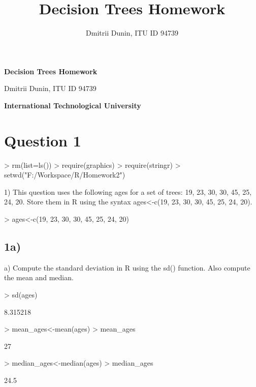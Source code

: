 \documentclass{article}
\title{Decision Trees Homework}
\author{Dmitrii Dunin, ITU ID 94739}
\begin{document}

\begin{center}
{\bf\Large Decision Trees Homework}
\end{center}
\begin{center}
{\Large Dmitrii Dunin, ITU ID 94739}
\end{center}
\begin{center}
{\bf\Large International Technological University}
\end{center}

\section*{Question 1}

\begin{Schunk}
\begin{Sinput}
> rm(list=ls())
> require(graphics)
> require(stringr)
> setwd("F:/Workspace/R/Homework2")
\end{Sinput}
\end{Schunk}

1) This question uses the following ages for a set of trees: 19, 23, 30, 30, 45,
25, 24, 20. Store them in R using the syntax ages<-c(19, 23, 30, 30, 45, 25, 24, 20).
\begin{Schunk}
\begin{Sinput}
> ages<-c(19, 23, 30, 30, 45, 25, 24, 20)
\end{Sinput}
\end{Schunk}
\subsection*{1a)}
a) Compute the standard deviation in R using the sd() function. Also compute the mean and median.
\begin{Schunk}
\begin{Sinput}
> sd(ages)
\end{Sinput}
\begin{Soutput}
[1] 8.315218
\end{Soutput}
\begin{Sinput}
> mean_ages<-mean(ages)
> mean_ages
\end{Sinput}
\begin{Soutput}
[1] 27
\end{Soutput}
\begin{Sinput}
> median_ages<-median(ages)
> median_ages
\end{Sinput}
\begin{Soutput}
[1] 24.5
\end{Soutput}
\end{Schunk}
\end{document}
